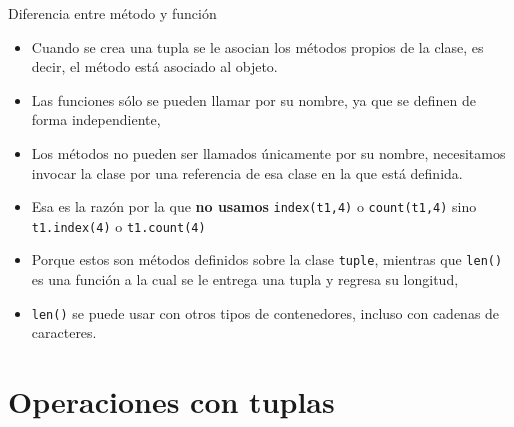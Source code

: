 \documentclass[
  ignorenonframetext,
  aspectratio=169,
  spanish,
]{beamer}
\begin{document}
\begin{frame}[fragile]{Diferencia entre método y función}
\label{diferencia-entre-muxe9todo-y-funciuxf3n}
\begin{itemize}
\item
  Cuando se crea una tupla se le asocian los métodos propios de la
  clase, es decir, el método está asociado al objeto.
\item
  Las funciones sólo se pueden llamar por su nombre, ya que se definen
  de forma independiente,
\item
  Los métodos no pueden ser llamados únicamente por su nombre,
  necesitamos invocar la clase por una referencia de esa clase en la que
  está definida.
\item
  Esa es la razón por la que \textbf{no usamos} \texttt{index(t1,4)} o
  \texttt{count(t1,4)} sino \texttt{t1.index(4)} o \texttt{t1.count(4)}
\item
  Porque estos son métodos definidos sobre la clase \texttt{tuple},
  mientras que \texttt{len()} es una función a la cual se le entrega una
  tupla y regresa su longitud,
\item
  \texttt{len()} se puede usar con otros tipos de contenedores, incluso
  con cadenas de caracteres.
\end{itemize}
\end{frame}

\section{Operaciones con tuplas}\label{operaciones-con-tuplas}
\end{document}
